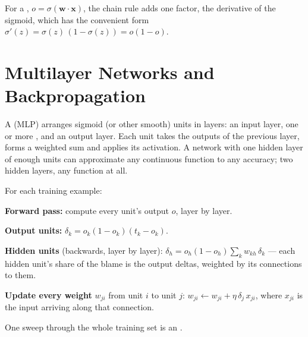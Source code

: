 For a , $o = \sigma(\mathbf{w}\cdot\mathbf{x})$, the chain rule adds
one factor, the derivative of the sigmoid, which has the convenient form
$\sigma'(z) = \sigma(z)\,(1 - \sigma(z)) = o(1 - o)$.

\section{Multilayer Networks and Backpropagation}

\begin{definitionbox}
A  (MLP) arranges sigmoid (or other smooth) units in
layers: an input layer, one or more , and an output layer. Each
unit takes the outputs of the previous layer, forms a weighted sum and applies its
activation. A network with one hidden layer of enough units can approximate any
continuous function to any accuracy; two hidden layers, any function at all.
\end{definitionbox}

\begin{definitionbox}
For each training example:
\begin{tightnum}
  \item \textbf{Forward pass:} compute every unit's output $o$, layer by layer.
  \item \textbf{Output units:} $\delta_k = o_k(1 - o_k)(t_k - o_k)$.
  \item \textbf{Hidden units} (backwards, layer by layer):
        $\delta_h = o_h(1 - o_h)\sum_{k} w_{kh}\,\delta_k$ --- each hidden unit's share
        of the blame is the output deltas, weighted by its connections to them.
  \item \textbf{Update every weight} $w_{ji}$ from unit $i$ to unit $j$:
        $w_{ji} \leftarrow w_{ji} + \eta\,\delta_j\,x_{ji}$, where $x_{ji}$ is the input
        arriving along that connection.
\end{tightnum}
One sweep through the whole training set is an .
\end{definitionbox}

